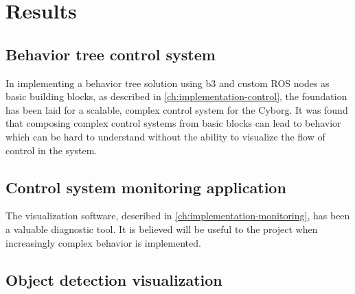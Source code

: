 \documentclass[\rootfolder/main.tex]{subfiles}
\begin{document}
\chapter{Results}
\label{ch:results} %



\section{Behavior tree control system}

In implementing a behavior tree solution using b3 and custom ROS nodes as basic building blocks, as described in \cref{ch:implementation-control}, the foundation has been laid for a scalable, complex control system for the Cyborg.
It was found that composing complex control systems from basic blocks can lead to behavior which can be hard to understand without the ability to visualize the flow of control in the system.


\section{Control system monitoring application}

The visualization software, described in \cref{ch:implementation-monitoring}, has been a valuable diagnostic tool. 
It is believed will be useful to the project when increasingly complex behavior is implemented.


\section{Object detection visualization}
\end{document}
